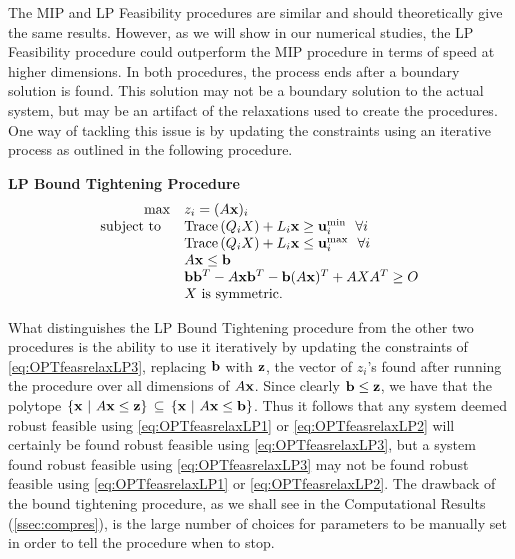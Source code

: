The MIP and LP Feasibility procedures are similar and should theoretically give the same results. 
However, as we will show in our numerical studies, the LP Feasibility procedure could outperform the MIP procedure in terms of speed at higher dimensions. 
In both procedures, the process ends after a boundary solution is found. 
This solution may not be a boundary solution to the actual system, but may be an artifact of the relaxations used to create the procedures. 
One way of tackling this issue is by updating the constraints using an iterative process as outlined in the following procedure.

\bigskip
\textbf{LP Bound Tightening Procedure}
\begin{equation}\label{eq:OPTfeasrelaxLP3}
\begin{array}{rl}
\max &  z_i = (A\mathbf{x})_i  \\
 \text{subject to } \ &\operatorname{Trace}\left(Q_iX\right)+ L_i\mathbf{x} \geq \mathbf{u}_i^{\min}  \ \ \forall i\\
 & \operatorname{Trace}\left(Q_iX\right)+ L_i\mathbf{x} \leq \mathbf{u}_i^{\max}  \ \ \forall i\\
 	&A\mathbf{x}\leq \mathbf{b} \\
 	&\mathbf{b}\mathbf{b}^T-A\mathbf{x}\mathbf{b}^T-\mathbf{b}(A\mathbf{x})^T+AXA^T\geq O \\
 	&X \text{ is symmetric.}
\end{array}
\end{equation}

What distinguishes the LP Bound Tightening procedure from the other two procedures is the ability to use it iteratively by updating the constraints of \cref{eq:OPTfeasrelaxLP3}, replacing $\mathbf{b}$ with $\mathbf{z}$, the vector of $z_i$'s found after running the procedure over all dimensions of $A\mathbf{x}$. 
Since clearly $\mathbf{b} \leq \mathbf{z}$, we have that the polytope $\{\mathbf{x} ~|~ A\mathbf{x}\leq \mathbf{z}\} \, \subseteq \, \{\mathbf{x} ~|~ A\mathbf{x}\leq \mathbf{b}\}$. 
Thus it follows that any system deemed robust feasible using \cref{eq:OPTfeasrelaxLP1} or \cref{eq:OPTfeasrelaxLP2} will certainly be found robust feasible using \cref{eq:OPTfeasrelaxLP3}, but a system found robust feasible using \cref{eq:OPTfeasrelaxLP3} may not be found robust feasible using \cref{eq:OPTfeasrelaxLP1} or \cref{eq:OPTfeasrelaxLP2}. 
The drawback of the bound tightening procedure, as we shall see in the Computational Results (\cref{ssec:compres}), is the large number of choices for parameters to be manually set in order to tell the procedure when to stop. 

